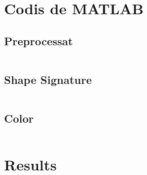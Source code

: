 
\section{Codis de MATLAB}

\subsection{Preprocessat}%
\label{app:pre}

\inputminted{matlab}{./code/preprocess.m}

\subsection{Shape Signature}%
\label{app:pre}
\inputminted{matlab}{./code/shapeSignature.m}

\pagebreak
\subsection{Color}%
\inputminted{matlab}{./code/splitColor.m}

\section{Results}


